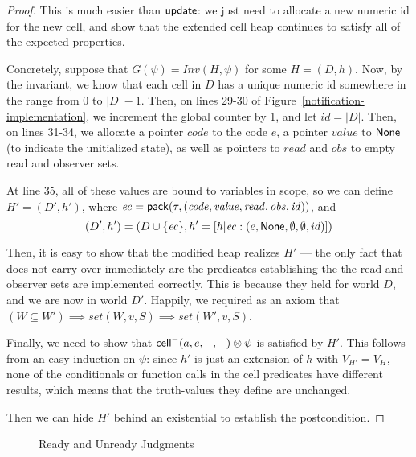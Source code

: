 \begin{proof}
This is much easier than $\mathsf{update}$: we just need to allocate a new
numeric id for the new cell, and show that the extended cell heap
continues to satisfy all of the expected properties.

Concretely, suppose that $G(\psi) = \mathit{Inv}{(H, \psi)}$ for some
$H = (D,h)$. Now, by the invariant, we know that each cell in $D$ has
a unique numeric id somewhere in the range from $0$ to $|D|-1$. Then,
on lines 29-30 of Figure~\ref{notification-implementation}, we
increment the global counter by 1, and let $id = |D|$.  Then, on lines
31-34, we allocate a pointer $\mathit{code}$ to the code $e$, a
pointer $\mathit{value}$ to $\mathsf{None}$ (to indicate the unitialized
state), as well as pointers to $\mathit{read}$ and $\mathit{obs}$ to
empty read and observer sets.

At line 35, all of these values are bound to variables in scope, so we
can define $H' = (D',h')$, where $\mathit{ec} = \mathsf{pack}({\tau}, {\mathit{(code, value, read, obs, id)}})$, 
and 
\begin{displaymath}
(D',h') = (D \cup \{{\mathit{ec}}\}, h' = [h|\mathit{ec}: (e, \mathsf{None}, \emptyset, \emptyset, id)])
\end{displaymath}

Then, it is easy to show that the modified heap realizes $H'$ --- the
only fact that does not carry over immediately are the predicates
establishing the the read and observer sets are implemented
correctly. This is because they held for world $D$, and we are now in
world $D'$. Happily, we required as an axiom that $(W \subseteq W')
\implies \mathit{set}(W, v, S) \implies \mathit{set}(W', v, S)$.

Finally, we need to show that $\mathsf{cell}^{-}({a}, {e}, {\_}, {\_}) \otimes \psi$ is
satisfied by $H'$. This follows from an easy induction on $\psi$:
since $h'$ is just an extension of $h$ with $V_{H'} = V_H$, none
of the conditionals or function calls in the cell predicates have
different results, which means that the truth-values they define
are unchanged. 

Then we can hide $H'$ behind an existential to establish the postcondition. 
\end{proof}

\begin{figure}
\mbox{}
\caption{Ready and Unready Judgments}
\label{readiness}
\end{figure}

